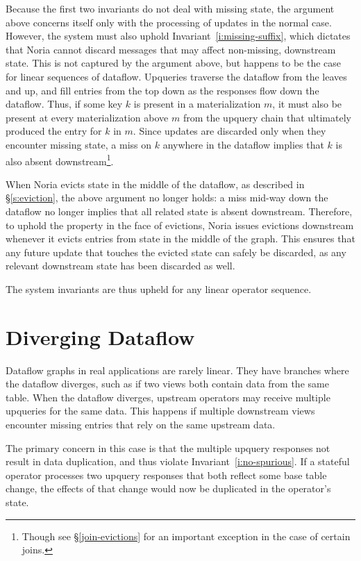 Because the first two invariants do not deal with missing state, the argument
above concerns itself only with the processing of updates in the normal case.
However, the system must also uphold Invariant~\ref{i:missing-suffix}, which
dictates that Noria cannot discard messages that may affect non-missing,
downstream state. This is not captured by the argument above, but happens to be
the case for linear sequences of dataflow. Upqueries traverse the dataflow from
the leaves and up, and fill entries from the top down as the responses flow down
the dataflow. Thus, if some key $k$ is present in a materialization $m$, it must
also be present at every materialization above $m$ from the upquery chain that
ultimately produced the entry for $k$ in $m$. Since updates are discarded only
when they encounter missing state, a miss on $k$ anywhere in the dataflow
implies that $k$ is also absent downstream\footnote{Though see
\S\ref{join-evictions} for an important exception in the case of certain
joins.}.

When Noria evicts state in the middle of the dataflow, as described in
\S\ref{s:eviction}, the above argument no longer holds: a miss mid-way down the
dataflow no longer implies that all related state is absent downstream.
Therefore, to uphold the property in the face of evictions, Noria issues
evictions downstream whenever it evicts entries from state in the middle of the
graph. This ensures that any future update that touches the evicted state can
safely be discarded, as any relevant downstream state has been discarded as
well.

The system invariants are thus upheld for any linear operator sequence.

\section{Diverging Dataflow}
\label{s:partial:diverging}

Dataflow graphs in real applications are rarely linear. They have branches where
the dataflow diverges, such as if two views both contain data from the same
table. When the dataflow diverges, upstream operators may receive multiple
upqueries for the same data. This happens if multiple downstream views encounter
missing entries that rely on the same upstream data.

The primary concern in this case is that the multiple upquery responses not
result in data duplication, and thus violate Invariant~\ref{i:no-spurious}. If a
stateful operator processes two upquery responses that both reflect some base
table change, the effects of that change would now be duplicated in the
operator's state.

